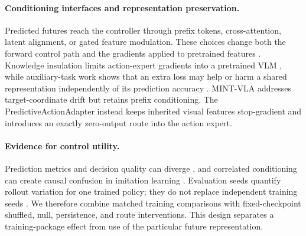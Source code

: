 \paragraph{Conditioning interfaces and representation preservation.}
Predicted futures reach the controller through prefix tokens, cross-attention,
latent alignment, or gated feature modulation.  These choices change both the
forward control path and the gradients applied to pretrained features
\citep{dreamvla2025,futurevla2026,deltavla2026}.  Knowledge insulation limits
action-expert gradients into a pretrained VLM \citep{knowledgeinsulation2025},
while auxiliary-task work shows that an extra loss may help or harm a shared
representation independently of its prediction accuracy
\citep{gradsim2018,pcgrad2020,forkmerge2023,lyle2021aux}.  MINT-VLA addresses
target-coordinate drift but retains prefix conditioning.  The
PredictiveActionAdapter instead keeps inherited visual features stop-gradient
and introduces an exactly zero-output route into the action expert.

\paragraph{Evidence for control utility.}
Prediction metrics and decision quality can diverge
\citep{worldarena2026,robowmbench2026,wmevalposition2026}, and correlated
conditioning can create causal confusion in imitation learning
\citep{causalconfusion2019,copycat2020}.  Evaluation seeds quantify rollout
variation for one trained policy; they do not replace independent training
seeds \citep{henderson2018,rliable2021}.  We therefore combine matched training
comparisons with fixed-checkpoint shuffled, null, persistence, and route
interventions.  This design separates a training-package effect from use of the
particular future representation.
